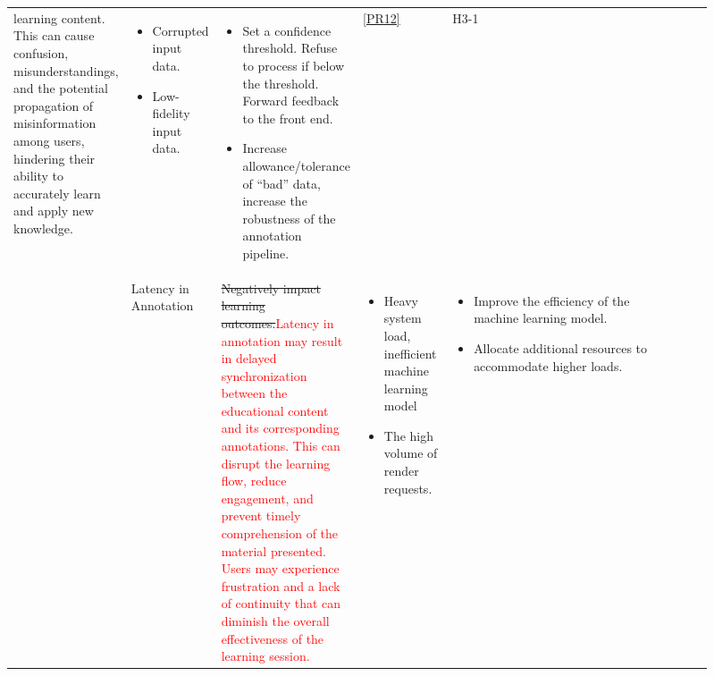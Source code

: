 \documentclass{article}
\begin{document}
\begin{landscape}
\begin{longtable}[h]{L{0.09\linewidth}L{0.1\linewidth}L{0.15\linewidth}L{0.13\linewidth}L{0.35\linewidth}L{0.05\linewidth}L{0.04\linewidth}}
{    learning content. This can cause confusion, misunderstandings, and the potential 
    propagation of misinformation among users, hindering their ability to accurately 
    learn and apply new knowledge.}
    & \vspace{-1.1\topsep}
      \begin{itemize}[nosep,topsep=0pt,leftmargin=10pt]
      \item Corrupted input data.
      \item Low-fidelity input data.
      \end{itemize}
      \vspace{-1.1\topsep}
    & \vspace{-1.1\topsep}
      \begin{itemize}[nosep,topsep=0pt,leftmargin=10pt]
      \item Set a confidence threshold. Refuse to process if below the threshold.
        Forward feedback to the front end.
      \item Increase allowance/tolerance of “bad” data, increase the robustness of
        the annotation pipeline.
      \end{itemize}
      \vspace{-1.1\topsep}
    & \ref{PR12}
    & H3-1 \\
    & Latency in Annotation
    & \sout{Negatively impact learning outcomes.}\textcolor{red}{Latency in annotation 
    may result in delayed synchronization between the educational content and its corresponding 
    annotations. This can disrupt the learning flow, reduce engagement, and prevent timely 
    comprehension of the material presented. Users may experience frustration and a lack of 
    continuity that can diminish the overall effectiveness of the learning session.}
    & \vspace{-1.1\topsep}
      \begin{itemize}[nosep,topsep=0pt,leftmargin=10pt]
      \item Heavy system load, inefficient machine learning model
      \item The high volume of render requests.
      \end{itemize}
      \vspace{-1.1\topsep}
    & \vspace{-1.1\topsep}
      \begin{itemize}[nosep,topsep=0pt,leftmargin=10pt]
      \item Improve the efficiency of the machine learning model.
      \item Allocate additional resources to accommodate higher loads.

\end{itemize}
\end{longtable}
\end{landscape}
\end{document}
